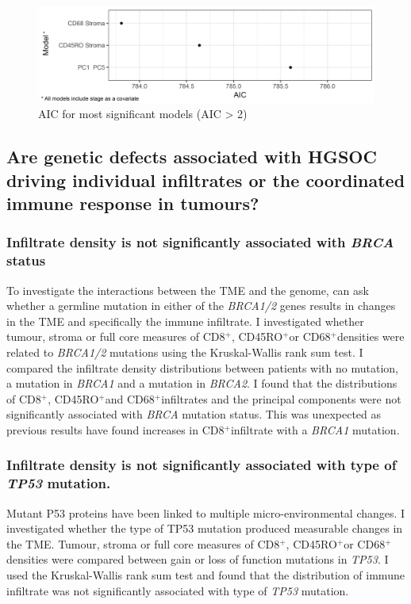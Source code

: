  \begin{figure}
     \centering
     \includegraphics{AIC}
     \caption{AIC for most significant models (AIC > 2)}
     \label{fig:AIC}
 \end{figure}


\subsection{Are genetic defects associated with HGSOC driving individual infiltrates or the coordinated immune response in tumours?}

\subsubsection*{Infiltrate density is not significantly associated with \textit{BRCA} status}
To investigate the interactions between the TME and the genome, can ask whether a germline mutation in either of the \textit{BRCA1/2} genes results in changes in the TME and specifically the immune infiltrate. I investigated whether tumour, stroma or full core measures of CD8$^+$, CD45RO$^+$or CD68$^+$densities were related to \textit{BRCA1/2} mutations using the Kruskal-Wallis rank sum test. I compared the infiltrate density distributions between patients with no mutation, a mutation in \textit{BRCA1} and a mutation in \textit{BRCA2}. I found that the distributions of CD8$^+$, CD45RO$^+$and CD68$^+$infiltrates and the principal components were not significantly associated with \textit{BRCA} mutation status. This was unexpected as previous results have found increases in CD8$^+$infiltrate with a \textit{BRCA1} mutation\cite{Clarke2009}.

\subsubsection{Infiltrate density is not significantly associated with type of \textit{TP53} mutation.}
Mutant P53 proteins have been linked to multiple micro-environmental changes\cite{Cordani2016}. I investigated whether the type of TP53 mutation produced measurable changes in the TME. Tumour, stroma or full core measures of CD8$^+$, CD45RO$^+$or CD68$^+$densities were compared between gain or loss of function mutations in \textit{TP53}. I used the Kruskal-Wallis rank sum test and found that the distribution of immune infiltrate was not significantly associated with type of \textit{TP53} mutation.

